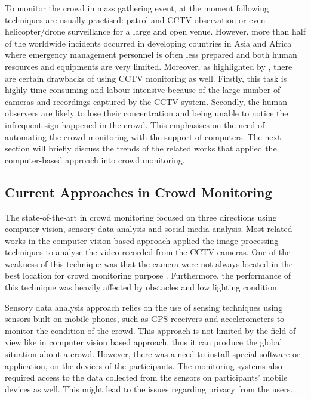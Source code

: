 To monitor the crowd in mass gathering event, at the moment following techniques are usually practised: patrol and CCTV observation or even helicopter/drone surveillance for a large and open venue. However, more than half of the worldwide incidents occurred in developing countries in Asia and Africa \citep{BurkleJr2011} where emergency management personnel is often less prepared and both human resources and equipments are very limited. Moreover, as highlighted by \citet{Davies1995}, there are certain drawbacks of using CCTV monitoring as well. Firstly, this task is highly time consuming and labour intensive because of the large number of cameras and recordings captured by the CCTV system. Secondly, the human observers are likely to lose their concentration and being unable to notice the infrequent sign happened in the crowd. This emphasises on the need of automating the crowd monitoring with the support of computers. The next section will briefly discuss the trends of the related works that applied the computer-based approach into crowd monitoring.

\subsection{Current Approaches in Crowd Monitoring}
The state-of-the-art in crowd monitoring focused on three directions using computer vision, sensory data analysis and social media analysis. Most related works in the computer vision based approach applied the image processing techniques to analyse the video recorded from the CCTV cameras. One of the weakness of this technique was that the camera were not always located in the best location for crowd monitoring purpose \citep{Davies1995}. Furthermore, the performance of this technique was heavily affected by obstacles and low lighting condition \citep{Wirz2012}

Sensory data analysis approach relies on the use of sensing techniques using sensors built on mobile phones, such as GPS receivers \citep{Wirz2012} and accelerometers \citep{Roggen2011} to monitor the condition of the crowd. This approach is not limited by the field of view like in computer vision based approach, thus it can produce the global situation about a crowd\citep{Wirz2012}. However, there was a need to install special software or application, on the devices of the participants. The monitoring systems also required access to the data collected from the sensors on participants' mobile devices as well. This might lead to the issues regarding privacy from the users.

